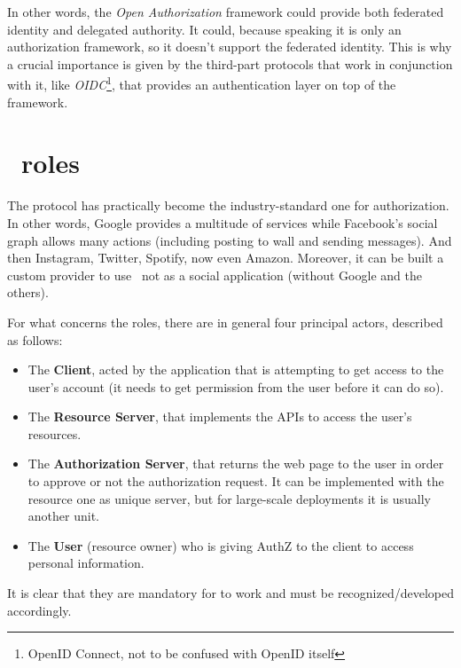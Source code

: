 In other words, the \textit{Open Authorization} framework could provide both federated identity and delegated authority. It could, because speaking it is only an authorization framework, so it doesn't support the federated identity. This is why a crucial importance is given by the third-part protocols that work in conjunction with it, like \textit{OIDC}\footnote{OpenID Connect, not to be confused with OpenID itself}, that provides an authentication layer on top of the \textit{\oauth} framework.

\section{\oauth\ roles}
The protocol has practically become the industry-standard one for authorization. In other words, Google provides a multitude of services while Facebook's social graph allows many actions (including posting to wall and sending messages). And then Instagram, Twitter, Spotify, now even Amazon. Moreover, it can be built a custom provider to use \oauth\ not as a social application (without Google and the others).

For what concerns the roles, there are in general four principal actors, described as follows:


\begin{itemize}
    \item The \textbf{Client}, acted by the application that is attempting to get access to the user's account (it needs to get permission from the user before it can do so).
    \item The \textbf{Resource Server}, that implements the APIs to access the user's resources.
    \item The \textbf{Authorization Server}, that returns the web page to the user in order to approve or not the authorization request. It can be implemented with the resource one as unique server, but for large-scale deployments it is usually another unit.
    \item The \textbf{User} (resource owner) who is giving AuthZ to the client to access personal information.
\end{itemize}

It is clear that they are mandatory for \textit{\oauth} to work and must be recognized/developed accordingly. 

